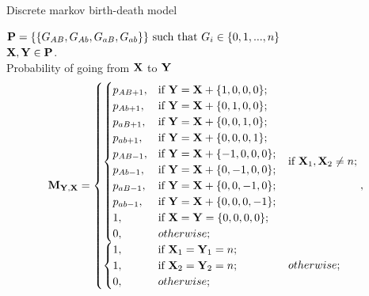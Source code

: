 \documentclass{beamer}
\begin{document}
\begin{frame}{Discrete markov birth-death model}
\footnotesize

$\bold{P} = \{\{G_{AB},G_{Ab},G_{aB},G_{ab}\}\} \text{ such that } G_i\in\{0,1,...,n\}$\\ 
$\bold{X},\bold{Y} \in \bold{P}$. \\

Probability of going from $\bold{X}$ to $\bold{Y}$
\begin{equation*}
\bold{M}_{\bold{Y},\bold{X}}=
\begin{aligned}
\begin{cases}
\begin{cases}
    p_{AB+1}, & \text{if } \bold{Y} = \bold{X} + \{1,0,0,0\}; \\
    p_{Ab+1}, & \text{if } \bold{Y} = \bold{X} + \{0,1,0,0\};  \\
    p_{aB+1}, & \text{if } \bold{Y} = \bold{X} + \{0,0,1,0\}; \\
    p_{ab+1}, & \text{if } \bold{Y} = \bold{X} + \{0,0,0,1\}; \\
    p_{AB-1}, & \text{if } \bold{Y} = \bold{X} + \{-1,0,0,0\}; \\
    p_{Ab-1}, & \text{if } \bold{Y} = \bold{X} + \{0,-1,0,0\};  \\
    p_{aB-1}, & \text{if } \bold{Y} = \bold{X} + \{0,0,-1,0\}; \\
    p_{ab-1}, & \text{if } \bold{Y} = \bold{X} + \{0,0,0,-1\}; \\
    1, & \text{if}\ \bold{X} = \bold{Y} = \{0,0,0,0\}; \\
    0, & otherwise;
\end{cases}  & \text{if}\ \bold{X}_1, \bold{X}_2 \neq n; \\
\begin{cases} 
    1, & \text{if}\ \bold{X}_1 = \bold{Y}_1 = n; \\
    1, & \text{if}\ \bold{X}_2 = \bold{Y}_2 = n;  \\
    \mathrlap{0,}\hphantom{p_{AB+1},} & otherwise;
\end{cases} & otherwise;
\end{cases},
\end{aligned}
\end{equation*}
\normalsize

\end{frame}
\end{document}
